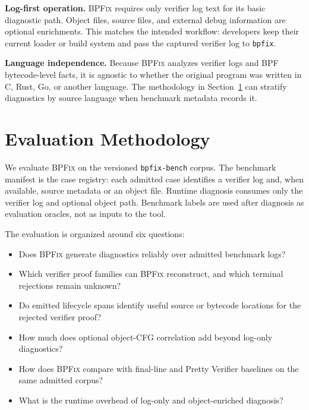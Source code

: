 \documentclass[sigplan,10pt,anonymous,review]{acmart}
\newcommand{\sys}{\textsc{BPFix}\xspace}
\begin{document}
\textbf{Log-first operation.}  \sys requires only verifier log text for its
basic diagnostic path.  Object files, source files, and external debug
information are optional enrichments.  This matches the intended workflow:
developers keep their current loader or build system and pass the captured
verifier log to \texttt{bpfix}.

\textbf{Language independence.}  Because \sys analyzes verifier logs and BPF
bytecode-level facts, it is agnostic to whether the original program was
written in C, Rust, Go, or another language.  The methodology in
Section~\ref{sec:eval} can stratify diagnostics by source language when
benchmark metadata records it.

\section{Evaluation Methodology}
\label{sec:eval}

We evaluate \sys on the versioned \texttt{bpfix-bench} corpus.  The benchmark
manifest is the case registry: each admitted case identifies a verifier log and,
when available, source metadata or an object file.  Runtime diagnosis consumes
only the verifier log and optional object path.  Benchmark labels are used after
diagnosis as evaluation oracles, not as inputs to the tool.

The evaluation is organized around six questions:
\begin{itemize}
  \item[\textbf{Q1}] Does \sys generate diagnostics reliably over admitted
        benchmark logs?
  \item[\textbf{Q2}] Which verifier proof families can \sys reconstruct, and
        which terminal rejections remain unknown?
  \item[\textbf{Q3}] Do emitted lifecycle spans identify useful source or
        bytecode locations for the rejected verifier proof?
  \item[\textbf{Q4}] How much does optional object-CFG correlation add
        beyond log-only diagnostics?
  \item[\textbf{Q5}] How does \sys compare with final-line and Pretty Verifier
        baselines on the same admitted corpus?
  \item[\textbf{Q6}] What is the runtime overhead of log-only and object-enriched
        diagnosis?
\end{itemize}
\end{document}
